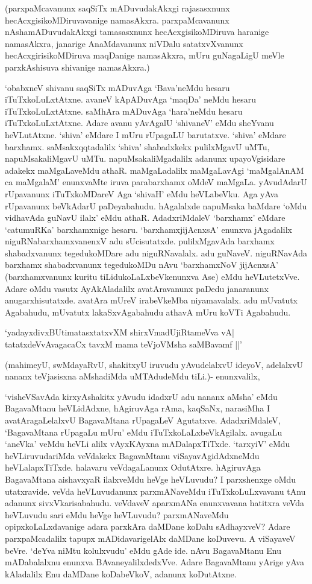 (parxpaMcavanunx saqSiTx mADuvudakAkxgi rajasasxnunx hecAcxgisikoMDiruvavanige namasAkxra. parxpaMcavanunx nAshamADuvudakAkxgi tamasasxnunx hecAcxgisikoMDiruva haranige namasAkxra, janarige AnaMdavanunx niVDalu satatxvXvanunx hecAcxgirisikoMDiruva maqDanige namasAkxra, mUru guNagaLigU meVle parxkAshisuva shivanige namasAkxra.)


`obabxneV shivanu saqSiTx mADuvAga `Bava'neMdu hesaru iTuTxkoLuLxtAtxne. avaneV kApADuvAga `maqDa' neMdu hesaru iTuTxkoLuLxtAtxne. saMhAra mADuvAga `hara'neMdu hesaru iTuTxkoLuLxtAtxne. Adare avanu yAvAgalU `shivaneV' eMdu sheYvanu heVLutAtxne. `shiva' eMdare I mUru rUpagaLU barutatxve. `shiva' eMdare barxhamx. saMsakxqqtadalilx `shiva' shabadxkekx pulilxMgavU uMTu, napuMsakaliMgavU uMTu. napuMsakaliMgadalilx adanunx upayoVgisidare adakekx maMgaLaveMdu athaR. maMgaLadalilx maMgaLavAgi `maMgalAnAM ca maMgalaM' enunxvaMte iruva parabarxhamx oMdeV maMgaLa. yAvudAdarU rUpavanunx iTuTxkoMDareV Aga `shivaH' eMdu heVLabeVku. Aga yAva rUpavanunx beVkAdarU paDeyabahudu. hAgalalxde napuMsaka baMdare `oMdu vidhavAda guNavU ilalx' eMdu athaR. AdadxriMdaleV `barxhamx' eMdare `catumuRKa' barxhamxnige hesaru. `barxhamxjijAcnxsA' enunxva jAgadalilx niguRNabarxhamxvanenxV adu sUcisutatxde. pulilxMgavAda barxhamx shabadxvanunx tegedukoMDare adu niguRNavalalx. adu guNaveV. niguRNavAda barxhamx shabadxvanunx tegedukoMDu nAvu `barxhamxNoV jijAcnxsA' (barxhamxvanunx kuritu tiLidukoLaLxbeVkenunxva Ase) eMdu heVLutetxVve. Adare oMdu vasutx AyAkAladalilx avatAravanunx paDedu janaranunx anugarxhisutatxde. avatAra mUreV irabeVkeMba niyamavalalx. adu mUvatutx Agabahudu, mUvatutx lakaSxvAgabahudu athavA mUru koVTi Agabahudu.

\begin{shloka}
`yadayxdivxBUtimatasxtatxvXM shirxVmadUjiRtameVva vA‌|\\
tatatxdeVvAvagacaCx tavxM mama teVjoVMsha saMBavamf ||'
\end{shloka}

(mahimeyU, swMdayaRvU, shakitxyU iruvudu yAvudelalxvU ideyoV, adelalxvU nananx teVjasisxna aMshadiMda uMTAdudeMdu tiLi.)- enunxvalilx,

`visheVSavAda kirxyAshakitx yAvudu idadxrU adu nananx aMsha' eMdu BagavaMtanu heVLidAdxne, hAgiruvAga rAma, kaqSaNx, narasiMha I avatAragaLelalxvU BagavaMtana rUpagaLeV Agutatxve. AdadxriMdaleV, `BagavaMtana rUpagaLu mUru' eMdu iTuTxkoLaLxbeVkAgilalx. avugaLu `aneVka' veMdu heVLi alilx vAyxKAyxna mADalapxTiTxde. `tarxyiV' eMdu heVLiruvudariMda veVdakekx BagavaMtanu viSayavAgidAdxneMdu heVLalapxTiTxde. halavaru veVdagaLanunx OdutAtxre. hAgiruvAga BagavaMtana aishavxyaR ilalxveMdu heVge heVLuvudu? I parxshenxge oMdu utatxravide. veVda heVLuvudanunx parxmANaveMdu iTuTxkoLuLxvavanu tAnu adanunx sivxVkarisabahudu. veVdaveV aparxmANa enunxvavana hatitxra veVda heVLuvudu sari eMdu heVge heVLuvudu? parxmANaveMdu opipxkoLaLxdavanige adara parxkAra daMDane koDalu sAdhayxveV? Adare parxpaMcadalilx tapupx mADidavarigelAlx daMDane koDuvevu. A viSayaveV beVre. `deYva niMtu kolulxvudu' eMdu gAde ide. nAvu BagavaMtanu Enu mADabalalxnu enunxva BAvaneyalilxdedxVve. Adare BagavaMtanu yArige yAva kAladalilx Enu daMDane koDabeVkoV, adanunx koDutAtxne.

